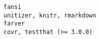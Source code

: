 \documentclass[
  letterpaper,
  DIV=11,
  numbers=noendperiod]{scrreprt}
\begin{document}
\begin{verbatim}
fansi                                                                                                                                                                                                                                                                                                                                                                                                                                                                                                                                                                                                                                                                                                                                                                                                                                                                                                                                                                                                                                                                                                                                                                                                                                                                              unitizer, knitr, rmarkdown
farver                                                                                                                                                                                                                                                                                                                                                                                                                                                                                                                                                                                                                                                                                                                                                                                                                                                                                                                                                                                                                                                                                                                                                                                                                                                                              covr, testthat (>= 3.0.0)

\end{verbatim}
\end{document}
